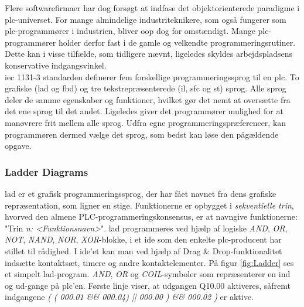 \noindent Flere softwarefirmaer har dog forsøgt at indfase det objektorienterede paradigme i \gls{plc}-universet. For mange almindelige industriteknikere, som også fungerer som \gls{plc}-programmører i industrien, bliver \gls{oop} dog for omstændigt. 
Mange \gls{plc}-programmører holder derfor fast i de gamle og velkendte programmeringsrutiner. Dette kan i visse tilfælde, som tidligere nævnt, ligeledes skyldes arbejdspladsens konservative indgangsvinkel\cite{PLC_Siemens_OOP}.  \\

\noindent \gls{iec} 1131-3 standarden definerer fem forskellige programmeringssprog til en \gls{plc}. To grafiske (\gls{lad} og \gls{fbd}) og tre tekstrepræsenterede (\gls{il}, \gls{sfc} og \gls{st}) sprog. Alle sprog deler de samme egenskaber og funktioner, hvilket gør det nemt at oversætte fra det ene sprog til det andet. Ligeledes giver det programmører mulighed for at manøvrere frit mellem alle sprog. Udfra egne programmeringspræferencer, kan programmøren dermed vælge det sprog, som bedst kan løse den pågældende opgave.

\subsubsection{Ladder Diagrams}
\gls{lad} er et grafisk programmeringssprog, der har fået navnet fra dens grafiske repræsentation, som ligner en stige. Funktionerne er opbygget i \textit{sekventielle trin}, hvorved den almene PLC-programmeringskonsensus, er at navngive funktionerne: "Trin \textit{n: <Funktionsnavn>}". 
\gls{lad} programmeres ved hjælp af logiske \textit{AND}, \textit{OR}, \textit{NOT}, \textit{NAND}, \textit{NOR}, \textit{XOR}-blokke, i et \gls{ide} som den enkelte \gls{plc}-producent har stillet til rådighed. I \gls{ide}'et kan man ved hjælp af Drag \& Drop-funktionalitet indsætte kontaktsæt, timere og andre kontaktelementer. På figur \ref{fig:Ladder} ses et simpelt \gls{lad}-program. \textit{AND}, \textit{OR} og \textit{COIL}-symboler som repræsenterer en ind og ud-gange på \gls{plc}'en. Første linje viser, at udgangen Q10.00 aktiveres, såfremt indgangene \textit{( ( 000.01 \&\& 000.04) || 000.00 ) \&\& 000.02 )} er aktive.


